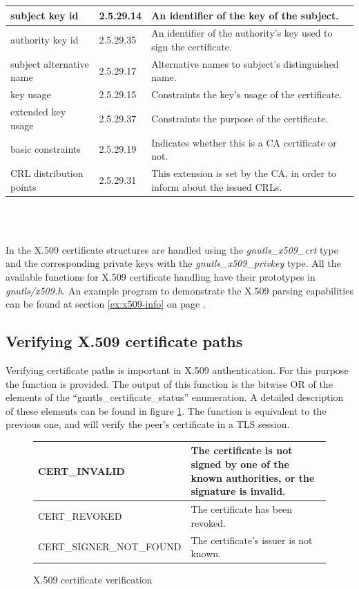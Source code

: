 \label{fig:x509_ext}
\begin{tabular}{|l|l|p{6cm}|}
\hline
subject key id & 2.5.29.14 & An identifier of the key of the subject.
\\
\hline
authority key id & 2.5.29.35 & An identifier of the authority's key used to sign the certificate.
\\
\hline
subject alternative name & 2.5.29.17 & Alternative names to subject's distinguished name.
\\
\hline
key usage & 2.5.29.15 & Constraints the key's usage of the certificate.
\\
\hline
extended key usage & 2.5.29.37 & Constraints the purpose of the certificate.
\\
\hline
basic constraints & 2.5.29.19 & Indicates whether this is a CA certificate or not.
\\
\hline
CRL distribution points & 2.5.29.31 & This extension is set by the CA, in order to inform about the issued CRLs.
\\
\hline
\end{tabular}
\\
\\
\par
In \gnutls{} the X.509 certificate structures are handled using the
\emph{gnutls\_x509\_crt} type and the corresponding private keys with
the \emph{gnutls\_x509\_privkey} type.
All the available functions for X.509 certificate handling have their 
prototypes in \emph{gnutls/x509.h}. An example program to demonstrate the 
X.509 parsing capabilities can be found at section \ref{ex:x509-info} on 
page \pageref{ex:x509-info}.

\subsection{Verifying X.509 certificate paths}
Verifying certificate paths is important 
in X.509 authentication. For this purpose the function
 is provided. The
output of this function is the bitwise OR of the elements of the
``gnutls\_certificate\_status'' enumeration. A detailed description of
these elements can be found in figure \ref{fig:verify}.
The function 
is equivalent to the previous one, and will verify the peer's certificate in a TLS session.

\begin{figure}[hbtp]
\begin{tabular}{|l|p{7cm}|}

\hline
CERT\_INVALID & The certificate is not signed by one of the known authorities, or
the signature is invalid.
\\
\hline
CERT\_REVOKED & The certificate has been revoked.
\\
\hline
CERT\_SIGNER\_NOT\_FOUND & The certificate's issuer is not known.
\\
\hline
\end{tabular}
\caption{X.509 certificate verification}
\label{fig:verify}
\end{figure}

